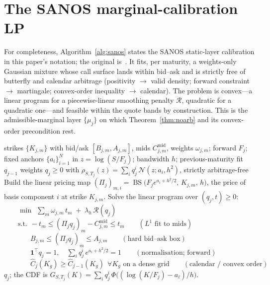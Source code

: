 \documentclass[11pt]{article}
\newcommand{\BS}{\operatorname{BS}}
\begin{document}
\appendix
\section{The SANOS marginal-calibration LP}
\label{app:sanoslp}

For completeness, Algorithm~\ref{alg:sanos} states the SANOS static-layer calibration in
this paper's notation; the original is~\cite{buehler2026sanos}. It fits, per maturity, a
weights-only Gaussian mixture whose call surface lands within bid--ask and is strictly free
of butterfly and calendar arbitrage (positivity $\to$ valid density; forward constraint
$\to$ martingale; convex-order inequality $\to$ calendar). The problem is convex---a linear
program for a piecewise-linear smoothing penalty $\mathcal R$, quadratic for a quadratic
one---and feasible within the quote bands by construction. This is the admissible-marginal
layer $\{\mu_j\}$ on which Theorem~\ref{thm:noarb} and its convex-order precondition rest.

\begin{algorithm}[h]
\caption{SANOS marginal-calibration LP at maturity $T_j$ (this paper's notation; after~\cite{buehler2026sanos}).}
\label{alg:sanos}
\begin{algorithmic}[1]
\Require strikes $\{K_{j,m}\}$ with bid/ask $[B_{j,m},A_{j,m}]$, mids $C^{\mathrm{mid}}_{j,m}$, weights $\omega_{j,m}$; forward $F_j$; fixed anchors $\{a_i\}_{i=1}^{N}$ in $z=\log(S/F_j)$; bandwidth $h$; previous-maturity fit $q_{j-1}$
\Ensure weights $q_j\ge0$ with $\rho_{S,T_j}(z)=\sum_i q_j^i\,\mathcal N(z;a_i,h^2)$, strictly arbitrage-free
\State Build the linear pricing map $(\Pi_j)_{m,i}=\BS\!\big(F_j e^{a_i+h^2/2},\,K_{j,m},\,h\big)$, the price of basis component $i$ at strike $K_{j,m}$.
\State Solve the linear program over $(q_j,t)\ge0$:
\Statex $\displaystyle\qquad \min\ \ \sum_m \omega_{j,m}\,t_m \;+\; \lambda_h\,\mathcal R(q_j)$
\Statex $\qquad \text{s.t.}\ \ -t_m \le (\Pi_j q_j)_m - C^{\mathrm{mid}}_{j,m} \le t_m \qquad (L^1\text{ fit to mids})$
\Statex $\qquad \phantom{\text{s.t.}}\ \ B_{j,m} \le (\Pi_j q_j)_m \le A_{j,m} \qquad (\text{hard bid--ask box})$
\Statex $\qquad \phantom{\text{s.t.}}\ \ \mathbf 1^\top q_j = 1,\quad \textstyle\sum_i q_j^i\,e^{a_i+h^2/2}=1 \qquad (\text{normalisation; forward})$
\Statex $\qquad \phantom{\text{s.t.}}\ \ \widehat C_j(K_g)\ge \widehat C_{j-1}(K_g)\ \ \forall K_g \text{ on a dense grid} \qquad (\text{calendar / convex order})$
\State \Return $q_j$; the CDF is $G_{S,T_j}(K)=\sum_i q_j^i\,\Phi\!\big((\log(K/F_j)-a_i)/h\big)$.
\end{algorithmic}
\end{algorithm}
\end{document}
